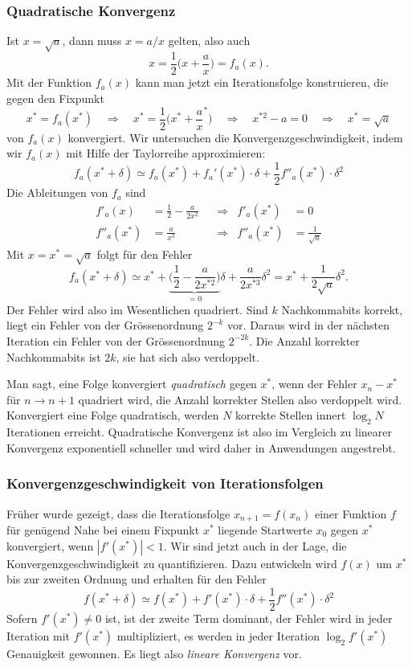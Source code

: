 \subsubsection{Quadratische Konvergenz}
Ist $x=\sqrt{a}$, dann muss $x = a/x$ gelten, also auch
\[
x = \frac12\biggl(x+\frac{a}x\biggr) = f_a(x).
\]
Mit der Funktion $f_a(x)$ kann man jetzt ein Iterationsfolge konstruieren,
die gegen den Fixpunkt 
\[
x^*=f_a(x^*)
\quad\Rightarrow\quad
x^*=\frac12\biggl(x^*+\frac{a}x^*\biggr)
\quad\Rightarrow\quad
x^{*2}-a=0
\quad\Rightarrow\quad
x^*=\sqrt{a}
\]
von $f_a(x)$ konvergiert.
Wir untersuchen die Konvergenzgeschwindigkeit, indem wir $f_a(x)$
mit Hilfe der Taylorreihe approximieren:
\[
f_a(x^*+\delta)
\simeq
f_a(x^*) + f_a'(x^*)\cdot\delta + \frac12f''_a(x^*)\cdot\delta^2
\]
Die Ableitungen von $f_a$ sind
\begin{align*}
f'_a(x)
&=
\frac12 -\frac{a}{2x^2}
&&\Rightarrow&
f'_a(x^*)&=0
\\
f''_a(x^*)
&=
\frac{a}{x^3}
&&\Rightarrow&
f''_a(x^*)&=\frac{1}{\!\sqrt{a}}
\end{align*}
Mit $x=x^* =\sqrt{a}$ folgt für den Fehler
\[
f_a(x^*+\delta)
\simeq
x^* + \underbrace{\biggl(\frac12-\frac{a}{2x^{*2}}\biggr)}_{\displaystyle=0}\delta
+
\frac{a}{2x^{*3}}\delta^2
=
x^* + \frac{1}{2\sqrt{a}}\delta^2.
\]
Der Fehler wird also im Wesentlichen quadriert.
Sind $k$ Nachkommabits korrekt, liegt ein Fehler von der Grössenordnung
$2^{-k}$ vor. 
Daraus wird in der nächsten Iteration ein Fehler von der Grössenordnung
$2^{-2k}$.
Die Anzahl korrekter Nachkommabits ist $2k$, sie hat sich also
verdoppelt.

Man sagt, eine Folge konvergiert {\em quadratisch} gegen $x^*$,
wenn der Fehler $x_n-x^*$ für $n\to n+1$ quadriert wird, die Anzahl
korrekter Stellen also verdoppelt wird.
Konvergiert eine Folge quadratisch, werden $N$ korrekte Stellen
innert $\log_2N$ Iterationen erreicht.
Quadratische Konvergenz ist also im Vergleich zu linearer Konvergenz
exponentiell schneller und wird daher in Anwendungen angestrebt.

\subsubsection{Konvergenzgeschwindigkeit von Iterationsfolgen}

Früher wurde gezeigt, dass die Iterationsfolge $x_{n+1}=f(x_n)$ einer
Funktion $f$ für genügend Nahe bei einem Fixpunkt $x^*$ liegende
Startwerte $x_0$ gegen $x^*$ konvergiert, wenn $|f'(x^*)| < 1$.
Wir sind jetzt auch in der Lage, die Konvergenzgeschwindigkeit
zu quantifizieren.
Dazu entwickeln wird $f(x)$ um $x^*$ bis zur zweiten Ordnung und
erhalten für den Fehler
\begin{equation}
f(x^*+\delta)
\simeq
f(x^*) + f'(x^*) \cdot \delta + \frac12f''(x^*)\cdot \delta^2
\label{buch:equation:iterkonv}
\end{equation}
Sofern $f'(x^*)\ne 0$ ist, ist der zweite Term dominant, der Fehler
wird in jeder Iteration mit $f'(x^*)$ multipliziert, es werden in
jeder Iteration $\log_2 f'(x^*)$ Genauigkeit gewonnen.
Es liegt also {\em lineare Konvergenz} vor.
%
%

